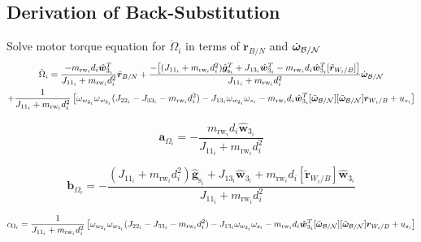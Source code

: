 \documentclass[]{BasiliskReportMemo}
\begin{document}
\subsection{Derivation of Back-Substitution}

Solve motor torque equation for $\dot{\Omega}_i$ in terms of $\ddot{\bm{r}}_{B/N}$ and $\dot{\bm\omega}_{\cal B/N}$
\begin{multline}
\dot{\Omega}_i
= \frac{-m_{\text{rw}_i} d_i \hat{\bm{w}}_{3_i}^T }{J_{11_i} + m_{\text{rw}_i} d_i^2}\ddot{\bm{r}}_{B/N} + \frac{-\big[(J_{11_i} + m_{\text{rw}_i} d_i^2)\hat{\bm g}_{\text{s}_i}^T  + J_{13_i}\hat{\bm w}_{3_i}^T -m_{\text{rw}_i} d_i \hat{\bm{w}}_{3_i}^T [\tilde{\bm r}_{W_i/B}]\big]}{J_{11_i} + m_{\text{rw}_i} d_i^2}\dot{\bm\omega}_{\cal B/N} 
\\
+\frac{1}{J_{11_i} + m_{\text{rw}_i} d_i^2}\left[\omega_{w_{2_i}} \omega_{w_{3_i}} (J_{22_i} - J_{33_i} - m_{\text{rw}_i} d_i^2
)-J_{13_i} \omega_{w_{2_i}}\omega_{s_i} -m_{\text{rw}_i} d_i \hat{\bm{w}}_{3_i}^T [\tilde{\bm\omega}_{\cal B/N}] [\tilde{\bm\omega}_{\cal B/N}] \bm r_{W_i/B} + u_{s_i} \right]
\label{eq:motorTorqueFinal2}
\end{multline}

\begin{equation}
\bm{a}_{\Omega_i} = -\frac{m_{\text{rw}_i} d_i \hat{\bm{w}}_{3_i} }{J_{11_i} + m_{\text{rw}_i} d_i^2}
\end{equation}

\begin{equation}
\bm{b}_{\Omega_i} = -\frac{(J_{11_i} + m_{\text{rw}_i} d_i^2)\hat{\bm g}_{\text{s}_i}  + J_{13_i}\hat{\bm w}_{3_i} +m_{\text{rw}_i} d_i  [\tilde{\bm r}_{W_i/B}]\hat{\bm{w}}_{3_i}}{J_{11_i} + m_{\text{rw}_i} d_i^2}
\end{equation}

\begin{equation}
c_{\Omega_i} = \frac{1}{J_{11_i} + m_{\text{rw}_i} d_i^2}\left[\omega_{w_{2_i}} \omega_{w_{3_i}} (J_{22_i} - J_{33_i} - m_{\text{rw}_i} d_i^2
) - J_{13_i} \omega_{w_{2_i}}\omega_{s_i} -m_{\text{rw}_i} d_i \hat{\bm{w}}_{3_i}^T [\tilde{\bm\omega}_{\cal B/N}] [\tilde{\bm\omega}_{\cal B/N}] \bm r_{W_i/B} + u_{s_i} \right]
\end{equation}
\end{document}
